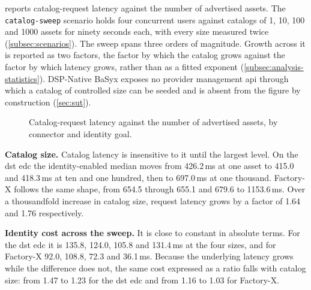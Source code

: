  reports catalog-request latency against the number of advertised assets. The \texttt{catalog-sweep} scenario holds four concurrent users against catalogs of 1, 10, 100 and 1000 assets for ninety seconds each, with every size measured twice (\cref{subsec:scenarios}). The sweep spans three orders of magnitude. Growth across it is reported as two factors, the factor by which the catalog grows against the factor by which latency grows, rather than as a fitted exponent (\cref{subsec:analysis-statistics}). DSP-Native BaSyx exposes no provider management \gls{api} through which a catalog of controlled size can be seeded and is absent from the figure by construction (\cref{sec:sut}).

\begin{figure}[ht]
    \centering
    \caption[Catalog latency against catalog size]{Catalog-request latency against the number of advertised assets, by connector and identity goal.}
    \label{fig:rq5-catalog}
\end{figure}

\textbf{Catalog size.} Catalog latency is insensitive to it until the largest level. On the \gls{dst} \gls{edc} the identity-enabled median moves from 426.2\,ms at one asset to 415.0 and 418.3\,ms at ten and one hundred, then to 697.0\,ms at one thousand. Factory-X follows the same shape, from 654.5 through 655.1 and 679.6 to 1153.6\,ms. Over a thousandfold increase in catalog size, request latency grows by a factor of 1.64 and 1.76 respectively.

\textbf{Identity cost across the sweep.} It is close to constant in absolute terms. For the \gls{dst} \gls{edc} it is 135.8, 124.0, 105.8 and 131.4\,ms at the four sizes, and for Factory-X 92.0, 108.8, 72.3 and 36.1\,ms. Because the underlying latency grows while the difference does not, the same cost expressed as a ratio falls with catalog size: from 1.47 to 1.23 for the \gls{dst} \gls{edc} and from 1.16 to 1.03 for Factory-X.

